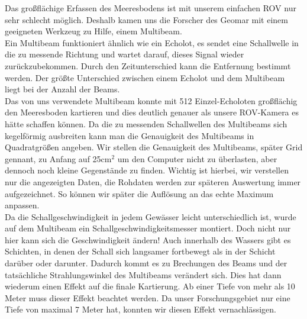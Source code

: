  

Das großflächige Erfassen des Meeresbodens ist mit unserem einfachen ROV nur sehr schlecht möglich. Deshalb kamen uns die Forscher des Geomar mit einem geeigneten Werkzeug zu Hilfe, einem \glqq Multibeam\grqq . \\

Ein Multibeam funktioniert ähnlich wie ein Echolot, es sendet eine Schallwelle in die zu messende 
Richtung und wartet darauf, dieses Signal wieder zurückzubekommen. Durch den Zeitunterschied 
kann die Entfernung bestimmt werden. Der größte Unterschied zwischen einem Echolot und dem Multibeam 
liegt bei der Anzahl der Beams. \\

Das von uns verwendete Multibeam konnte mit 512 Einzel-Echoloten großflächig den Meeresboden kartieren und dies 
deutlich genauer als unsere ROV-Kamera es hätte schaffen können. Da die zu messenden Schallwellen des Multibeams 
sich kegelförmig ausbreiten kann man die Genauigkeit des Multibeams in Quadratgrößen angeben. 
Wir stellen die Genauigkeit des Multibeams, später Grid gennant, zu Anfang auf 25cm$^2$ um den Computer nicht zu überlasten, aber 
dennoch noch kleine Gegenstände zu finden. Wichtig ist hierbei, wir verstellen nur die angezeigten Daten, die Rohdaten werden zur späteren Auswertung immer aufgezeichnet. 
So können wir später die Auflösung an das echte Maximum anpassen.\\

Da die Schallgeschwindigkeit in jedem Gewässer leicht unterschiedlich ist, wurde auf dem Multibeam
ein Schallgeschwindigkeitsmesser montiert. Doch nicht nur hier kann sich die Geschwindigkeit ändern!
Auch innerhalb des Wassers gibt es Schichten, in denen der Schall sich langsamer fortbewegt als in
der Schicht darüber oder darunter. Dadurch kommt es zu Brechungen des Beams und der tatsächliche 
Strahlungswinkel des Multibeams verändert sich. Dies hat dann wiederum einen Effekt auf die finale Kartierung.
Ab einer Tiefe von mehr als 10 Meter muss dieser Effekt beachtet werden. Da unser Forschungsgebiet nur eine 
Tiefe von maximal 7 Meter hat, konnten wir diesen Effekt vernachlässigen.\\

